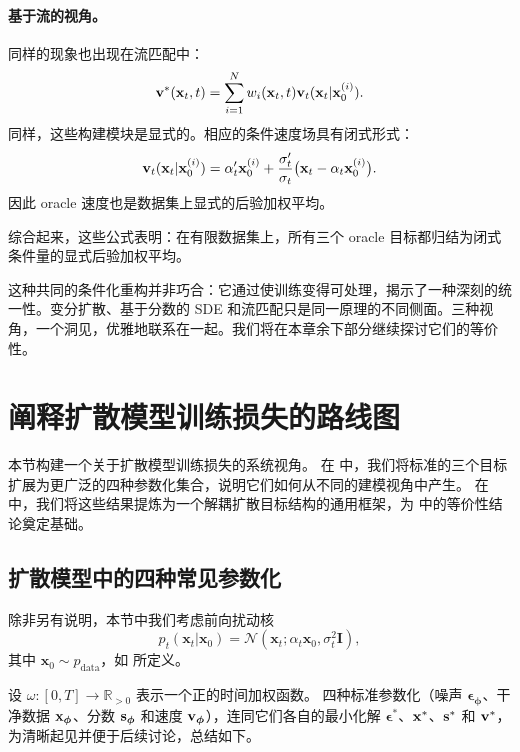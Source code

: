 {\paragraph{基于流的视角。}
同样的现象也出现在流匹配中：
\[
\mathbf{v}^*({\mathbf{x}}_t,t)
=
\sum_{i=1}^N
w_i({\mathbf{x}}_t,t) 
\mathbf{v}_t({\mathbf{x}}_t|{\mathbf{x}}_0^{(i)}).
\]
同样，这些构建模块是显式的。相应的条件速度场具有闭式形式：
\[
\mathbf{v}_t({\mathbf{x}}_t|{\mathbf{x}}_0^{(i)})
=
{\alpha}'_t {\mathbf{x}}_0^{(i)}
+
\frac{{\sigma}'_t}{\sigma_t}\bigl({\mathbf{x}}_t-\alpha_t{\mathbf{x}}_0^{(i)}\bigr).
\]
因此 oracle 速度也是数据集上显式的后验加权平均。

综合起来，这些公式表明：在有限数据集上，所有三个 oracle 目标都归结为闭式条件量的显式后验加权平均。
}

这种共同的条件化重构并非巧合：它通过使训练变得可处理，揭示了一种深刻的统一性。变分扩散、基于分数的 SDE 和流匹配只是同一原理的不同侧面。三种视角，一个洞见，优雅地联系在一起。我们将在本章余下部分继续探讨它们的等价性。

\newpage
\clearpage

\section{阐释扩散模型训练损失的路线图
}\label{sec:elucidating}

本节构建一个关于扩散模型训练损失的系统视角。
在  中，我们将标准的三个目标扩展为更广泛的四种参数化集合，说明它们如何从不同的建模视角中产生。
在  中，我们将这些结果提炼为一个解耦扩散目标结构的通用框架，为  中的等价性结论奠定基础。




\subsection{扩散模型中的四种常见参数化}\label{subsec:four-predictions}
除非另有说明，本节中我们考虑前向扰动核
\[
p_t(\mathbf{x}_t|\mathbf{x}_0) = \mathcal{N}\left(\mathbf{x}_t; \alpha_t \mathbf{x}_0, \sigma_t^2 \mathbf{I} \right),
\]
其中 $\mathbf{x}_0 \sim p_{\mathrm{data}}$，如  所定义。



设 $\omega: [0, T] \to \mathbb{R}_{>0}$ 表示一个正的时间加权函数。
四种标准参数化（噪声 $\bm{\epsilon}_{\bm{\phi}}$、干净数据 ${\mathbf{x}}_{\bm{\phi}}$、分数 ${\mathbf{s}}_{\bm{\phi}}$ 和速度 ${\mathbf{v}}_{\bm{\phi}}$），连同它们各自的最小化解 $\bm{\epsilon}^*$、${\mathbf{x}}^*$、${\mathbf{s}}^*$ 和 ${\mathbf{v}}^*$，为清晰起见并便于后续讨论，总结如下。

